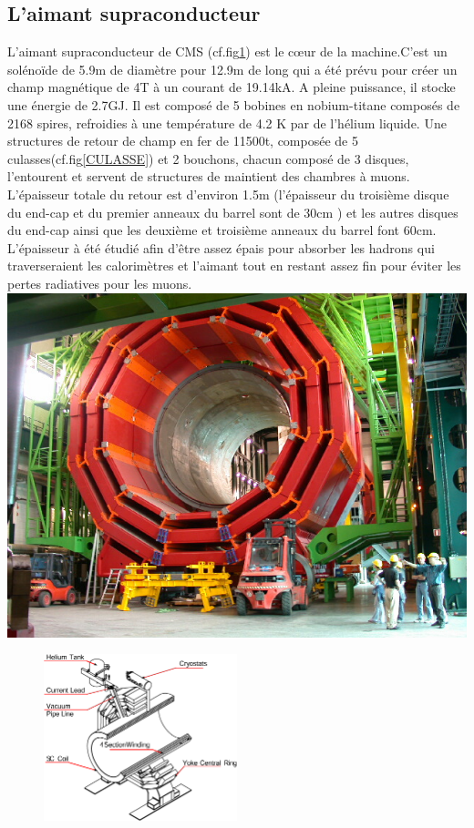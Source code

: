 \subsection{L'aimant supraconducteur}
L'aimant supraconducteur de CMS (cf.fig\ref{MAGNET}) est le cœur de la machine.C'est un solénoïde de 5.9m de diamètre pour 12.9m de long qui a été prévu pour créer un champ magnétique de 4T à un courant de 19.14kA. A pleine puissance, il stocke une énergie de 2.7GJ. Il est composé de 5 bobines en nobium-titane composés de 2168 spires, refroidies à une température de 4.2 K par de l'hélium liquide. Une structures de retour de champ en fer de 11500t, composée de 5 culasses(cf.fig\ref{CULASSE}) et 2 bouchons, chacun composé de 3 disques, l'entourent et servent de structures de maintient des chambres à muons. L'épaisseur totale du retour est d'environ 1.5m (l'épaisseur du troisième disque du end-cap et du premier anneaux du barrel sont de 30cm ) et les autres disques du end-cap ainsi que les deuxième et troisième anneaux du barrel font 60cm. L'épaisseur à été étudié afin d'être assez épais pour absorber les hadrons qui traverseraient les calorimètres et l'aimant tout en restant assez fin pour éviter les pertes radiatives pour les muons.
\marginpar
{
	\centering
	\includegraphics[width=\marginparwidth]{CMS/CULASSE.jpg}
	\label{CULASSE}
}
\begin{figure}[ht!]
	\centering
	\includegraphics[width=0.50\textwidth]{CMS/MAGNET.png}
	\label{MAGNET}
\end{figure}
